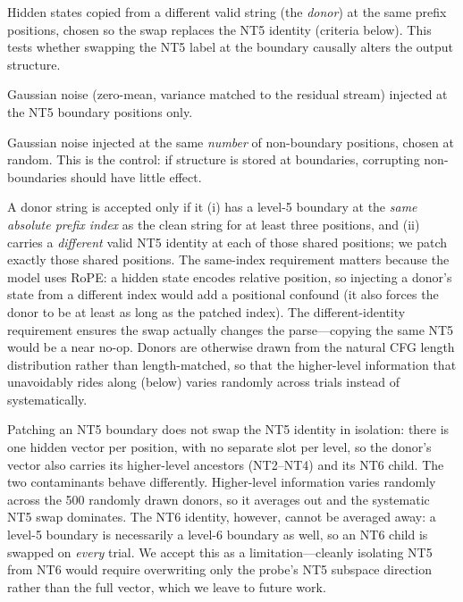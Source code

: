 \documentclass[10pt,twocolumn]{article}
\begin{document}
\begin{description}[leftmargin=*, itemsep=0pt]
  \item[Donor.] Hidden states copied from a different valid string (the \emph{donor}) at the same prefix positions, chosen so the swap replaces the NT5 identity (criteria below). This tests whether swapping the NT5 label at the boundary causally alters the output structure.
  \item[Noise (boundary).] Gaussian noise (zero-mean, variance matched to the residual stream) injected at the NT5 boundary positions only.
  \item[Noise (non-boundary).] Gaussian noise injected at the same \emph{number} of non-boundary positions, chosen at random. This is the control: if structure is stored at boundaries, corrupting non-boundaries should have little effect.
\end{description}

A donor string is accepted only if it (i) has a level-5 boundary at the \emph{same absolute prefix index} as the clean string for at least three positions, and (ii) carries a \emph{different} valid NT5 identity at each of those shared positions; we patch exactly those shared positions. The same-index requirement matters because the model uses RoPE: a hidden state encodes relative position, so injecting a donor's state from a different index would add a positional confound (it also forces the donor to be at least as long as the patched index). The different-identity requirement ensures the swap actually changes the parse---copying the same NT5 would be a near no-op. Donors are otherwise drawn from the natural CFG length distribution rather than length-matched, so that the higher-level information that unavoidably rides along (below) varies randomly across trials instead of systematically.

Patching an NT5 boundary does not swap the NT5 identity in isolation: there is one hidden vector per position, with no separate slot per level, so the donor's vector also carries its higher-level ancestors (NT2--NT4) and its NT6 child. The two contaminants behave differently. Higher-level information varies randomly across the 500 randomly drawn donors, so it averages out and the systematic NT5 swap dominates. The NT6 identity, however, cannot be averaged away: a level-5 boundary is necessarily a level-6 boundary as well, so an NT6 child is swapped on \emph{every} trial. We accept this as a limitation---cleanly isolating NT5 from NT6 would require overwriting only the probe's NT5 subspace direction rather than the full vector, which we leave to future work.
\end{document}
